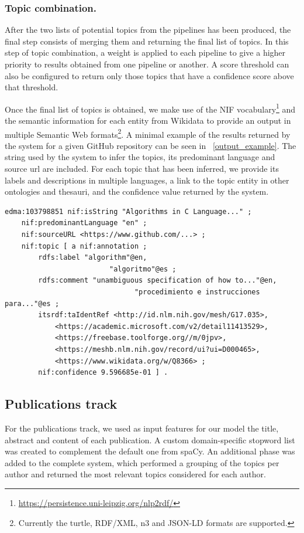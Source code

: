 \documentclass[runningheads]{llncs}
\begin{document}
\subsubsection{Topic combination.}
After the two lists of potential topics from the pipelines has been produced, the final step consists of merging them and returning the final list of topics. In this step of topic combination, a weight is applied to each pipeline to give a higher priority to results obtained from one pipeline or another. A score threshold can also be configured to return only those topics that have a confidence score above that threshold.

Once the final list of topics is obtained, we make use of the NIF vocabulary\footnote{\url{https://persistence.uni-leipzig.org/nlp2rdf/}} and the semantic information for each entity from Wikidata to provide an output in multiple Semantic Web formats\footnote{Currently the turtle, RDF/XML, n3 and JSON-LD formats are supported.}. A minimal example of the results returned by the system for a given GitHub repository can be seen in \figurename~\ref{output_example}. The string used by the system to infer the topics, its predominant language and source url are included. For each topic that has been inferred, we provide its labels and descriptions in multiple languages, a link to the topic entity in other ontologies and thesauri, and the confidence value returned by the system.

\begin{center}
\begin{lstlisting}[tabsize=2, breaklines=True, basicstyle=\footnotesize\ttfamily,]
edma:103798851 nif:isString "Algorithms in C Language..." ;
	nif:predominantLanguage "en" ;
	nif:sourceURL <https://www.github.com/...> ;
	nif:topic [ a nif:annotation ;
		rdfs:label "algorithm"@en,
					     "algoritmo"@es ;
		rdfs:comment "unambiguous specification of how to..."@en,
							   "procedimiento e instrucciones para..."@es ;
		itsrdf:taIdentRef <http://id.nlm.nih.gov/mesh/G17.035>,
			<https://academic.microsoft.com/v2/detail11413529>,
			<https://freebase.toolforge.org//m/0jpv>,
			<https://meshb.nlm.nih.gov/record/ui?ui=D000465>,
			<https://www.wikidata.org/w/Q8366> ;
		nif:confidence 9.596685e-01 ] .
\end{lstlisting}

\label{output_example}
\end{center}


\subsection{Publications track}
For the publications track, we used as input features for our model the title, abstract and content of each publication. A custom domain-specific stopword list was created to complement the default one from spaCy. An additional phase was added to the complete system, which performed a grouping of the topics per author and returned the most relevant topics considered for each author. 
\end{document}
